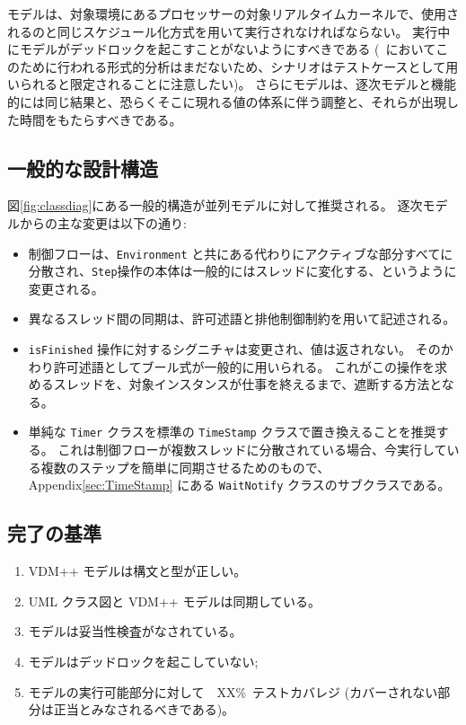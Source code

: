 \documentclass[\pformat,12pt]{jreport}
\begin{document}
モデルは、対象環境にあるプロセッサーの対象リアルタイムカーネルで、使用されるのと同じスケジュール化方式を用いて実行されなければならない。
実行中にモデルがデッドロックを起こすことがないようにすべきである (\VDMTools\ においてこのために行われる形式的分析はまだないため、シナリオはテストケースとして用いられると限定されることに注意したい)。 
さらにモデルは、逐次モデルと機能的には同じ結果と、恐らくそこに現れる値の体系に伴う調整と、それらが出現した時間をもたらすべきである。

\subsection{一般的な設計構造}\label{sec:designconcur}

 図\ref{fig:classdiag}にある一般的構造が並列モデルに対して推奨される。
逐次モデルからの主な変更は以下の通り:

\begin{itemize}
\item 制御フローは、\texttt{Environment} と共にある代わりにアクティブな部分すべてに分散され、\texttt{Step}操作の本体は一般的にはスレッドに変化する、というように変更される。
\item 異なるスレッド間の同期は、許可述語と排他制御制約を用いて記述される。
\item  \texttt{isFinished} 操作に対するシグニチャは変更され、値は返されない。
そのかわり許可述語としてブール式が一般的に用いられる。
これがこの操作を求めるスレッドを、対象インスタンスが仕事を終えるまで、遮断する方法となる。
\item 単純な \texttt{Timer} クラスを標準の \texttt{TimeStamp} クラスで置き換えることを推奨する。
これは制御フローが複数スレッドに分散されている場合、今実行している複数のステップを簡単に同期させるためのもので、 Appendix\ref{sec:TimeStamp} にある \texttt{WaitNotify} クラスのサブクラスである。
\end{itemize}

\subsection{完了の基準}

\begin{enumerate}
\item  VDM++ モデルは構文と型が正しい。
\item  UML クラス図と VDM++ モデルは同期している。
\item モデルは妥当性検査がなされている。
\item モデルはデッドロックを起こしていない;
\item モデルの実行可能部分に対して　XX\%\ テストカバレジ
(カバーされない部分は正当とみなされるべきである)。
\end{enumerate}
\end{document}
